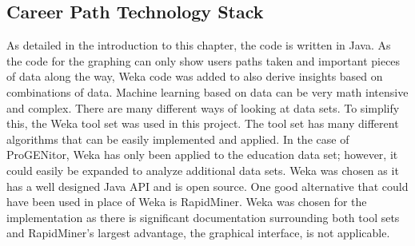\subsection{Career Path Technology Stack}
As detailed in the introduction to this chapter, the code is written in Java. 
As the code for the graphing can only show users paths taken and important
pieces of data along the way, Weka code was added to also derive insights based on
combinations of data.  Machine learning based on data can be very math intensive
and complex.  There are many different ways of looking at data sets.  To
simplify this, the Weka tool set was used in this project.  The tool set has
many different algorithms that can be easily implemented and applied.  In the case of
ProGENitor, Weka has only been applied to the education data set; however, it
could easily be expanded to analyze additional data sets.  Weka was chosen as it
has a well designed Java API and is open source.  One good alternative
that could have been used in place of Weka is RapidMiner.  Weka was chosen
for the implementation as there is significant documentation surrounding both
tool sets and RapidMiner's largest advantage, the graphical interface, is not applicable.
